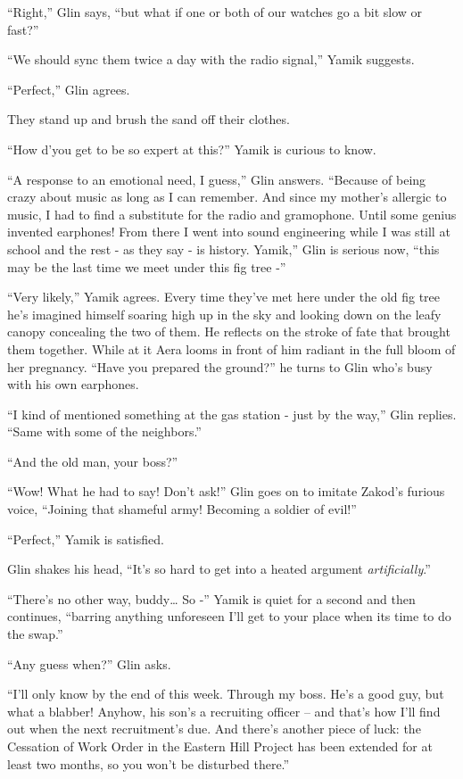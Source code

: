 \documentclass[twoside,11pt]{book}
\begin{document}
``Right,'' Glin says, ``but what if one or both of our watches go a bit slow or
fast?''

``We should sync them twice a day with the radio signal,'' Yamik suggests.

``Perfect,'' Glin agrees.

They stand up and brush the sand off their clothes.

``How d'you get to be so expert at this?'' Yamik is curious to know.

``A response to an emotional need, I guess,'' Glin answers. ``Because of being
crazy about music as long as I can remember. And since my mother's allergic to music, I had to find a substitute for
the radio and gramophone. Until some genius invented earphones! From there I went into sound engineering while I was
still at school and the rest - as they say - is history. Yamik,'' Glin is serious now, ``this
may be the last time we meet under this fig tree -''

``Very likely,'' Yamik agrees. Every time they've met here under the old fig tree he's
imagined himself soaring high up in the sky and looking down on the leafy canopy concealing the two of them. He
reflects on the stroke of fate that brought them together. While at it Aera looms in front of him radiant in the full
bloom of her pregnancy. ``Have you prepared the ground?'' he turns to Glin who's busy with
his own earphones.

``I kind of mentioned something at the gas station - just by the way,'' Glin replies.
``Same with some of the neighbors.''

``And the old man, your boss?''

``Wow! What he had to say! Don't ask!'' Glin goes on to imitate Zakod's furious voice,
``Joining that shameful army! Becoming a soldier of evil!''

``Perfect,'' Yamik is satisfied.

Glin shakes his head, ``It's so hard to get into a heated argument \textit{artificially}.''

``There's no other way, buddy{\dots} So -'' Yamik is quiet for a second and then continues,
``barring anything unforeseen I'll get to your place when its time to do the swap.''

``Any guess when?'' Glin asks.

``I'll only know by the end of this week. Through my boss. He's a good guy, but what a blabber! Anyhow, his
son's a recruiting officer -- and that's how I'll find out when the next recruitment's due. And there's another piece
of luck: the Cessation of Work Order in the Eastern Hill Project has been extended for at least two months, so you
won't be disturbed there.''
\end{document}
